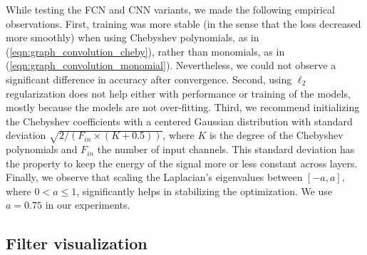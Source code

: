 \documentclass[final,twocolumn,3p,times,sort&compress]{elsarticle}
\newcommand{\todo}[1]{{\color[rgb]{.6,.1,.6}{#1}}}
\newcommand{\eqnref}[1]{(\ref{eqn:#1})}
\newcommand{\1}{\b{1}}              %
\newcommand{\0}{\b{0}}              %
\begin{document}
While testing the FCN and CNN variants, we made the following empirical observations.
First, training was more stable (in the sense that the loss decreased more smoothly) when using Chebyshev polynomials, as in \eqnref{graph_convolution_cheby}, rather than monomials, as in \eqnref{graph_convolution_monomial}.
Nevertheless, we could not observe a significant difference in accuracy after convergence.
Second, using $\ell_2$ regularization does not help either with performance or training of the models, mostly because the models are not over-fitting.
Third, we recommend initializing the Chebyshev coefficients with a centered Gaussian distribution with standard deviation $\sqrt{2/(F_{in} \times (K + 0.5))}$, where $K$ is the degree of the Chebyshev polynomials and $F_{in}$ the number of input channels. This standard deviation has the property to keep the energy of the signal more or less constant across layers.
\todo{Nath: cite the paper you read about that?}
Finally, we observe that scaling the Laplacian's eigenvalues between $[-a, a]$, where $0 < a \leq 1$, significantly helps in stabilizing the optimization. We use $a = 0.75$ in our experiments.

\subsection{Filter visualization}
\end{document}
